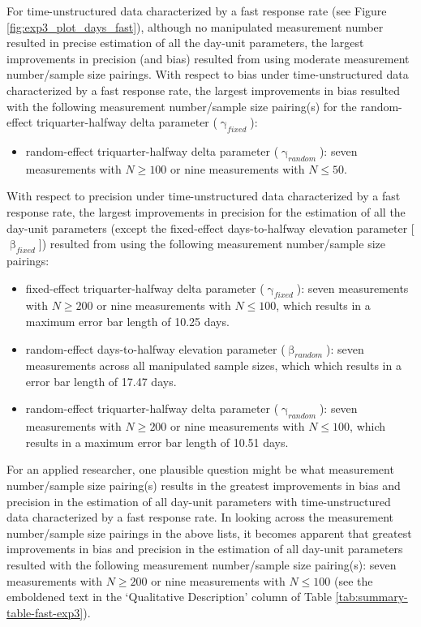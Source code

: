 \documentclass[
12pt, %
twoside,
english]{guelphthesis}
\begin{document}
For time-unstructured data characterized by a fast response rate (see Figure \ref{fig:exp3_plot_days_fast}), although no manipulated measurement number resulted in precise estimation of all the day-unit parameters, the largest improvements in precision (and bias) resulted from using moderate measurement number/sample size pairings. With respect to bias under time-unstructured data characterized by a fast response rate, the largest improvements in bias resulted with the following measurement number/sample size pairing(s) for the random-effect triquarter-halfway delta parameter (\(\upgamma_{fixed}\)):
\begin{itemize}
\tightlist
\item
  random-effect triquarter-halfway delta parameter (\(\upgamma_{random}\)): seven measurements with \(N \ge 100\) or nine measurements with \(N \le 50\).
\end{itemize}
\noindent With respect to precision under time-unstructured data characterized by a fast response rate, the largest improvements in precision for the estimation of all the day-unit parameters (except the fixed-effect days-to-halfway elevation parameter {[}\(\upbeta_{fixed}\){]}) resulted from using the following measurement number/sample size pairings:
\begin{itemize}
\tightlist
\item
  fixed-effect triquarter-halfway delta parameter (\(\upgamma_{fixed}\)): seven measurements with \(N \ge 200\) or nine measurements with \(N \le 100\), which results in a maximum error bar length of 10.25 days.
\item
  random-effect days-to-halfway elevation parameter (\(\upbeta_{random}\)): seven measurements across all manipulated sample sizes, which which results in a error bar length of 17.47 days.
\item
  random-effect triquarter-halfway delta parameter (\(\upgamma_{random}\)): seven measurements with \(N \ge 200\) or nine measurements with \(N \le 100\), which results in a maximum error bar length of 10.51 days.
\end{itemize}
For an applied researcher, one plausible question might be what measurement number/sample size pairing(s) results in the greatest improvements in bias and precision in the estimation of all day-unit parameters with time-unstructured data characterized by a fast response rate. In looking across the measurement number/sample size pairings in the above lists, it becomes apparent that greatest improvements in bias and precision in the estimation of all day-unit parameters resulted with the following measurement number/sample size pairing(s): seven measurements with \(N \ge 200\) or nine measurements with \(N \le 100\) (see the emboldened text in the `Qualitative Description' column of Table \ref{tab:summary-table-fast-exp3}).
\end{document}
